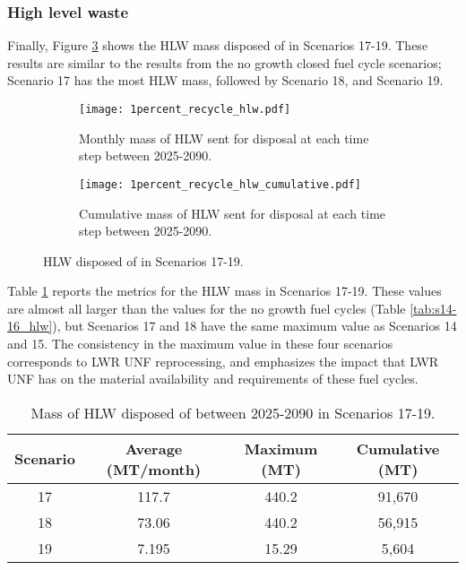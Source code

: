 \subsubsection{High level waste}
Finally, Figure \ref{fig:1percent_recycle_hlw} shows the \gls{HLW} 
mass disposed of in Scenarios 17-19. These results are similar to 
the results from the no growth closed fuel cycle scenarios; Scenario 
17 has the most \gls{HLW} mass, followed by Scenario 18, and Scenario 
19. 
\begin{figure}[h!]
    \centering
    \begin{subfigure}[b]{0.49\textwidth}
        \centering
        \texttt{[image: 1percent\_recycle\_hlw.pdf]}
        \caption{Monthly mass of HLW sent for disposal 
        at each time step between 2025-2090.}
        \label{fig:1percent_recycle_hlw_all}
    \end{subfigure}
    \hfill
    \begin{subfigure}[b]{0.49\textwidth}
        \centering
        \texttt{[image: 1percent\_recycle\_hlw\_cumulative.pdf]}
        \caption{Cumulative mass of HLW sent for disposal 
        at each time step between 2025-2090.}
        \label{fig:1percent_recycle_hlw_cumulative}
    \end{subfigure}
       \caption{\gls{HLW} disposed of in Scenarios 17-19.}
       \label{fig:1percent_recycle_hlw}
\end{figure}

Table \ref{tab:s17-19_hlw} reports the metrics for the \gls{HLW} mass 
in Scenarios 17-19. These values are almost all larger than the 
values for the no growth fuel cycles (Table \ref{tab:s14-16_hlw}), but 
Scenarios 17 and 18 have the same maximum value as Scenarios 14 and 15. The 
consistency in the maximum value in these four scenarios corresponds to 
\gls{LWR} \gls{UNF} reprocessing, and emphasizes the impact that 
\gls{LWR} \gls{UNF} has on the material availability and requirements 
of these fuel cycles. 

\begin{table}[h!]
    \centering 
    \caption{Mass of HLW disposed of between 2025-2090 in 
    Scenarios 17-19.}
    \label{tab:s17-19_hlw}
    \begin{tabular}{c c c c}
        \hline 
        Scenario & Average (MT/month) & Maximum (MT) & Cumulative (MT) \\
        \hline
        17 & 117.7 & 440.2 & 91,670 \\
        18 & 73.06 & 440.2 & 56,915 \\
        19 & 7.195 & 15.29 & 5,604 \\
        \hline
    \end{tabular}
\end{table}

